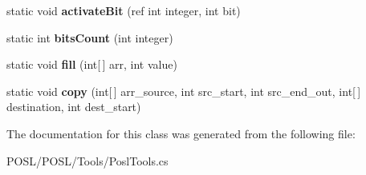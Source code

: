 \begin{DoxyCompactItemize}
static void {\bfseries activate\+Bit} (ref int integer, int bit)
\item 
\mbox{\label{classPOSL_1_1Tools_1_1PoslTools_a50359e10dbf5edc16bfd2f6ea15fde8e}} 
static int {\bfseries bits\+Count} (int integer)
\item 
\mbox{\label{classPOSL_1_1Tools_1_1PoslTools_aef0a2855d3824d991351e981f45b593f}} 
static void {\bfseries fill} (int\mbox{[}$\,$\mbox{]} arr, int value)
\item 
\mbox{\label{classPOSL_1_1Tools_1_1PoslTools_aed6c90bf894a5aab4c6f212ddaa3b1c0}} 
static void {\bfseries copy} (int\mbox{[}$\,$\mbox{]} arr\+\_\+source, int src\+\_\+start, int src\+\_\+end\+\_\+out, int\mbox{[}$\,$\mbox{]} destination, int dest\+\_\+start)
\end{DoxyCompactItemize}


The documentation for this class was generated from the following file\+:\begin{DoxyCompactItemize}
\item 
P\+O\+S\+L/\+P\+O\+S\+L/\+Tools/Posl\+Tools.\+cs\end{DoxyCompactItemize}

